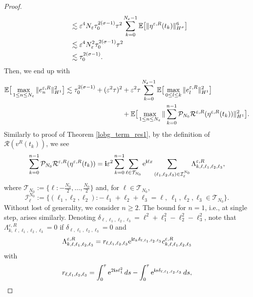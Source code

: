 \documentclass[a4paper]{amsart}
\begin{document}
\begin{proof}
\begin{align*}
        &\hspace{0.2cm}\lesssim \varepsilon^{4}N_\varepsilon\tau_0^{2(\sigma-1)}\tau^{2}\sum_{k=0}^{N_\varepsilon-1}\mathbb{E}\big[\|\eta^{\varepsilon,R}(t_k)\|^{6}_{H^\sigma}\big]\\
        &\hspace{0.2cm}\lesssim \varepsilon^{4}N_\varepsilon^{2}\tau_0^{2(\sigma-1)}\tau^{2}\\
        &\hspace{0.2cm}\lesssim \tau_0^{2(\sigma-1)}.
\end{align*}
Then, we end up with 
\begin{align}
\mathbb{E}\big[\max_{1\le n\le N_\varepsilon}\|e^{\varepsilon,R}_{n}\|^{2}_{H^1}\big] \lesssim  \tau_0^{2(\sigma-1)}+(\varepsilon^2 \tau)^{2}&+\varepsilon^2 \tau\sum_{k=0}^{N_\varepsilon-1} \mathbb{E}\big[\max_{0\le l \le k}\|e^{\varepsilon,R}_l\|^{2}_{H^1}\big]\notag \\
&+\mathbb{E}\big[\max_{1\le n\le N_\varepsilon}\|\sum_{k=0}^{n-1}\mathcal{P}_{N_0}\mathcal{R}^{\varepsilon,R}(\eta^{\varepsilon,R}(t_k))\|^{2}_{H^1}\big]  \label{in_es0}.
\end{align}
 Similarly to proof of Theorem \ref{lobg_term_res1},  by the definition of $\mathcal{R}(v^R(t_k))$, we see
$$
\sum_{k=0}^{n-1} \mathcal{P}_{N_0}\mathcal{R}^{\varepsilon,R}(\eta^{\varepsilon,R}(t_k))={\bf i}\varepsilon^2 \sum_{k=0}^{n-1} \displaystyle\sum_{\ell \in \mathcal{T}_{N_0}}{\rm e}^{{\bf i}\ell x}\displaystyle\sum_{(\ell_1,\ell_2,\ell_3)\in\mathcal{I}_\ell^{N_0}} \Lambda^{\varepsilon,R}_{k,\ell,\ell_1,\ell_2,\ell_3},
$$
where
$
\mathcal{T}_{N_0}:=\{\ell: -\frac{N_0}{2},\dots,\frac{N_0}{2}\}
$
and, for $\ell \in \mathcal{T}_{N_0}$, 
$$
\mathcal{I}_\ell^{N_0}:=\{(\ell_1,\ell_2,\ell_2): -\ell_1+\ell_2+\ell_3=\ell,\  \ell_1,\ell_2,\ell_3\in \mathcal{T}_{N_0}\}.
$$
Without lost of generality, we consider $n\ge 2$. The bound for $n=1$, i.e., at single step, arises similarly.
Denoting $\delta_{\ell,\ell_1,\ell_2,\ell_3}=\ell^2+\ell_1^2-\ell_2^2-\ell_3^2$, note that $\Lambda^{\varepsilon,R}_{k,\ell,\ell_1,\ell_2,\ell_3}=0$ if $\delta_{\ell,\ell_1,\ell_2,\ell_3}=0$ and 
$$
\Lambda^{\varepsilon,R}_{k,\ell,\ell_1,\ell_2,\ell_3}=r_{\ell,\ell_1,\ell_2,\ell_3} {\rm e}^{{\bf i}t_k\delta_{\ell,\ell_1,\ell_2,\ell_3}} c^{\varepsilon,R}_{k,\ell,\ell_1,\ell_2,\ell_3}
$$
with
\begin{align*}
&r_{\ell,\ell_1,\ell_2,\ell_3}=\int_0^\tau {\rm e}^{2{\bf i}s \ell_1^2}\,ds-\int_0^\tau {\rm e}^{{\bf i}s \delta_{\ell,\ell_1,\ell_2,\ell_3}}\,ds,\\

\end{align*}
\end{proof}
\end{document}
